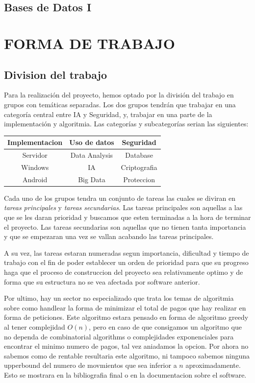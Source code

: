 \documentclass{article}
\theoremstyle{definition}
\begin{document}
\subsection{Bases de Datos I}

\section{FORMA DE TRABAJO}

\subsection{Division del trabajo}

Para la realización del proyecto, hemos optado por la división del trabajo en grupos con temáticas separadas. Los dos grupos tendrán que trabajar en una categoría central entre IA y Seguridad, y, trabajar en una parte de la implementación y algoritmia. Las categorías y subcategorías serian las siguientes:

\begin{center}
\begin{tabular}{|c|c|c|}
	\hline	
	\cellcolor{cyan!12} Implementacion & \cellcolor{cyan!12}Uso de datos & \cellcolor{cyan!12}Seguridad \\ \hline
	Servidor & Data Analysis & Database \\
	Windows & IA & Criptografia \\
	Android & Big Data & Proteccion \\
	\hline
	
\end{tabular}
\end{center}



Cada uno de los grupos tendra un conjunto de tareas las cuales se diviran en \textit{tareas principales} y \textit{tareas secundarias}. Las tareas principales son aquellas a las que se les daran prioridad y buscamos que esten terminadas a la hora de terminar el proyecto. Las tareas secundarias son aquellas que no tienen tanta importancia y que se empezaran una vez se vallan acabando las tareas principales.

A su vez, las tareas estaran numeradas segun importancia, dificultad y tiempo de trabajo con el fin de poder establecer un orden de prioridad para que su progreso haga que el proceso de construccion del proyecto sea relativamente optimo y de forma que su estructura no se vea afectada por software anterior.

Por ultimo, hay un sector no especializado que trata los temas de algoritmia sobre como handlear la forma de minimizar el total de pagos que hay realizar en forma de peticiones. Este algoritmo estara pensado en forma de algoritmo greedy al tener complejidad $O(n)$, pero en caso de que consigamos un algoritmo que no dependa de combinatorial algorithms o complejidades exponenciales para encontrar el minimo numero de pagos, tal vez aniadamos la opcion. Por ahora no sabemos como de rentable resultaria este algoritmo, ni tampoco sabemos ninguna upperbound del numero de movmientos que sea inferior a $n$ aproximadamente. Esto se mostrara en la bibliografia final o en la documentacion sobre el software.
\end{document}

